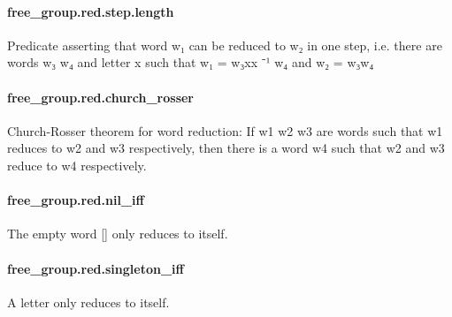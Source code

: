 \documentclass{article}
\begin{document}
\paragraph{free\_group.red.step.length}
\par
Predicate asserting that word 
\colorbox[RGB]{253,246,227}{{{{\color[RGB]{101, 123, 131} w₁ }}}} can be reduced to 
\colorbox[RGB]{253,246,227}{{{{\color[RGB]{101, 123, 131} w₂ }}}} in one step, i.e. there are words
\colorbox[RGB]{253,246,227}{{{{\color[RGB]{101, 123, 131} w₃ w₄ }}}} and letter 
\colorbox[RGB]{253,246,227}{{{{\color[RGB]{101, 123, 131} x }}}} such that 
\colorbox[RGB]{253,246,227}{{{{\color[RGB]{101, 123, 131} w₁  }}}{{{\color[RGB]{181, 137, 0} = }}}{{{\color[RGB]{101, 123, 131}  w₃xx }}}{{{\color[RGB]{181, 137, 0} ⁻¹ }}}{{{\color[RGB]{101, 123, 131} w₄ }}}} and 
\colorbox[RGB]{253,246,227}{{{{\color[RGB]{101, 123, 131} w₂  }}}{{{\color[RGB]{181, 137, 0} = }}}{{{\color[RGB]{101, 123, 131}  w₃w₄ }}}}\paragraph{free\_group.red.church\_rosser}
\par
Church-Rosser theorem for word reduction: If 
\colorbox[RGB]{253,246,227}{{{{\color[RGB]{101, 123, 131} w1 w2 w3 }}}} are words such that 
\colorbox[RGB]{253,246,227}{{{{\color[RGB]{101, 123, 131} w1 }}}} reduces to 
\colorbox[RGB]{253,246,227}{{{{\color[RGB]{101, 123, 131} w2 }}}}and 
\colorbox[RGB]{253,246,227}{{{{\color[RGB]{101, 123, 131} w3 }}}} respectively, then there is a word 
\colorbox[RGB]{253,246,227}{{{{\color[RGB]{101, 123, 131} w4 }}}} such that 
\colorbox[RGB]{253,246,227}{{{{\color[RGB]{101, 123, 131} w2 }}}} and 
\colorbox[RGB]{253,246,227}{{{{\color[RGB]{101, 123, 131} w3 }}}} reduce to 
\colorbox[RGB]{253,246,227}{{{{\color[RGB]{101, 123, 131} w4 }}}} respectively.
\paragraph{free\_group.red.nil\_iff}
\par
The empty word 
\colorbox[RGB]{253,246,227}{{{{\color[RGB]{101, 123, 131} {[}{]} }}}} only reduces to itself.
\paragraph{free\_group.red.singleton\_iff}
\par
A letter only reduces to itself.
\end{document}
